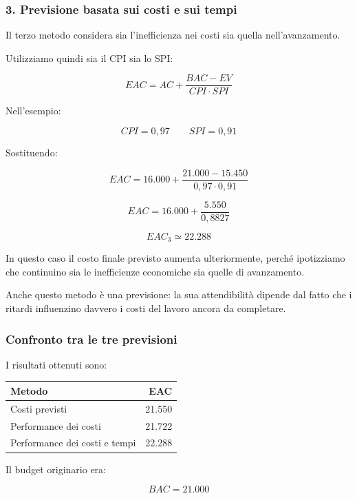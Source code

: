 \subsubsection*{3. Previsione basata sui costi e sui tempi}

\noindent Il terzo metodo considera
sia l'inefficienza nei costi
sia quella nell'avanzamento.

\medskip

\noindent Utilizziamo quindi
sia il CPI sia lo SPI:

\[
\boxed{
EAC=AC+\frac{BAC-EV}{CPI\cdot SPI}
}
\]

\noindent Nell'esempio:

\[
CPI=0{,}97
\qquad
SPI=0{,}91
\]

\noindent Sostituendo:

\[
EAC=16.000+
\frac{21.000-15.450}{0{,}97\cdot0{,}91}
\]

\[
EAC=16.000+
\frac{5.550}{0{,}8827}
\]

\[
\boxed{EAC_3\simeq22.288}
\]

\noindent In questo caso il costo finale
previsto aumenta ulteriormente,
perché ipotizziamo che continuino
sia le inefficienze economiche
sia quelle di avanzamento.

\medskip

\noindent Anche questo metodo è una previsione:
la sua attendibilità dipende dal fatto
che i ritardi influenzino davvero
i costi del lavoro ancora da completare.


\subsubsection*{Confronto tra le tre previsioni}

\noindent I risultati ottenuti sono:

\begin{center}
\begin{tabular}{|p{7cm}|r|}
\hline
\textbf{Metodo} & \textbf{EAC} \\
\hline
Costi previsti & 21.550 \\
\hline
Performance dei costi & 21.722 \\
\hline
Performance dei costi e tempi & 22.288 \\
\hline
\end{tabular}
\end{center}

\noindent Il budget originario era:

\[
\boxed{BAC=21.000}
\]

